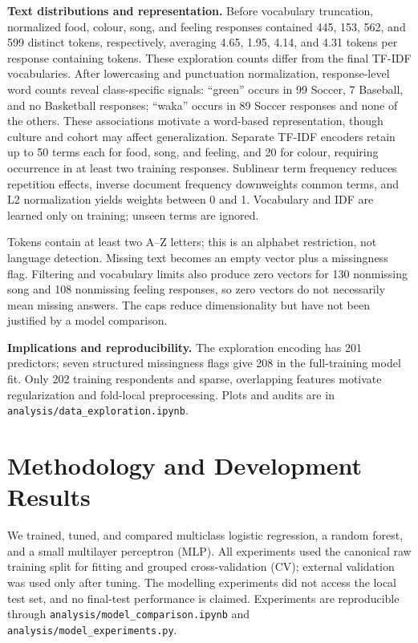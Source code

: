 \documentclass[10pt,letterpaper]{article}
\newcommand{\topic}[1]{\par\smallskip\textbf{#1}\quad}
\begin{document}
\topic{Text distributions and representation.}
Before vocabulary truncation, normalized food, colour, song, and feeling responses
contained 445, 153, 562, and 599 distinct tokens, respectively, averaging
4.65, 1.95, 4.14, and 4.31 tokens per response containing tokens.
These exploration counts differ from the final TF-IDF vocabularies.
After lowercasing and punctuation normalization, response-level word counts reveal
class-specific signals: ``green'' occurs
in 99 Soccer, 7 Baseball, and no Basketball responses; ``waka'' occurs in 89 Soccer
responses and none of the others. These associations motivate a word-based
representation, though culture and cohort may affect generalization.
Separate TF-IDF encoders retain up to 50 terms each for food, song, and feeling,
and 20 for colour, requiring occurrence in at least two training responses.
Sublinear term frequency reduces repetition effects, inverse document frequency
downweights common terms, and L2 normalization yields weights between 0 and 1.
Vocabulary and IDF are learned only on training; unseen terms are ignored.

Tokens contain at least two A--Z letters; this is an alphabet restriction, not
language detection. Missing text becomes an empty vector plus a missingness flag.
Filtering and vocabulary limits also produce zero vectors for 130 nonmissing song
and 108 nonmissing feeling responses, so zero vectors do not necessarily mean
missing answers. The caps reduce dimensionality but have not been justified by
a model comparison.

\topic{Implications and reproducibility.}
The exploration encoding has 201 predictors; seven structured missingness flags
give 208 in the full-training model fit. Only 202 training respondents and sparse,
overlapping features motivate regularization and fold-local preprocessing.
Plots and audits are in \texttt{analysis/data\_exploration.ipynb}.

\clearpage
\section{Methodology and Development Results}
\label{sec:methodology}
We trained, tuned, and compared multiclass logistic regression, a random forest,
and a small multilayer perceptron (MLP). All experiments used the canonical raw
training split for fitting and grouped cross-validation (CV); external validation
was used only after tuning. The modelling experiments did not access the local
test set, and no final-test performance is claimed. Experiments are reproducible through
\texttt{analysis/model\_comparison.ipynb} and \texttt{analysis/model\_experiments.py}.
\end{document}

